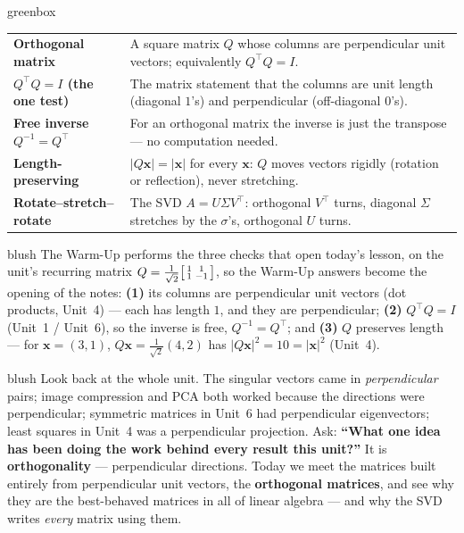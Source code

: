 \documentclass[10pt]{article}
\newcommand{\xx}{\mathbf{x}}
\newcommand{\T}{^{\top}}
\begin{document}
\begin{skillbox}{greenbox}
\renewcommand{\arraystretch}{1.3}
\begin{tabularx}{\linewidth}{@{}l X@{}}
\textbf{Orthogonal matrix} & A square matrix $Q$ whose columns are perpendicular unit vectors; equivalently $Q\T Q=I$. \\
\textbf{$Q\T Q=I$ (the one test)} & The matrix statement that the columns are unit length (diagonal $1$'s) and perpendicular (off-diagonal $0$'s). \\
\textbf{Free inverse $Q^{-1}=Q\T$} & For an orthogonal matrix the inverse is just the transpose --- no computation needed. \\
\textbf{Length-preserving} & $|Q\xx|=|\xx|$ for every $\xx$: $Q$ moves vectors rigidly (rotation or reflection), never stretching. \\
\textbf{Rotate--stretch--rotate} & The SVD $A=U\Sigma V\T$: orthogonal $V\T$ turns, diagonal $\Sigma$ stretches by the $\sigma$'s, orthogonal $U$ turns. \\
\end{tabularx}
\end{skillbox}

\begin{fixedskillbox}{blush}
    The Warm-Up performs the three checks that open today's lesson, on the unit's recurring matrix
    $Q=\tfrac1{\sqrt2}\begin{bsmallmatrix} 1 & 1\\ 1 & -1 \end{bsmallmatrix}$, so the Warm-Up answers become the
    opening of the notes: \textbf{(1)} its columns are perpendicular unit vectors (dot products, Unit~4) ---
    each has length $1$, and they are perpendicular; \textbf{(2)} $Q\T Q=I$ (Unit~1 / Unit~6), so the inverse is
    free, $Q^{-1}=Q\T$; and \textbf{(3)} $Q$ preserves length --- for $\xx=(3,1)$, $Q\xx=\tfrac1{\sqrt2}(4,2)$
    has $|Q\xx|^2=10=|\xx|^2$ (Unit~4).
\end{fixedskillbox}

\begin{skillbox}[Hook]{blush}
    Look back at the whole unit. The singular vectors came in \emph{perpendicular} pairs; image compression and
    PCA both worked because the directions were perpendicular; symmetric matrices in Unit~6 had perpendicular
    eigenvectors; least squares in Unit~4 was a perpendicular projection. Ask: \textbf{``What one idea has been
    doing the work behind every result this unit?''} It is \textbf{orthogonality} --- perpendicular directions.
    Today we meet the matrices built entirely from perpendicular unit vectors, the \textbf{orthogonal matrices},
    and see why they are the best-behaved matrices in all of linear algebra --- and why the SVD writes
    \emph{every} matrix using them.
\end{skillbox}
\end{document}
